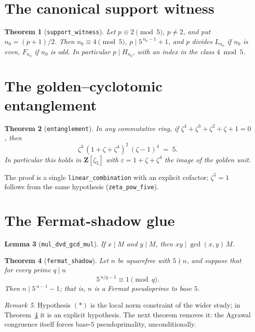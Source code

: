 \documentclass[11pt]{amsart}
\newtheorem{theorem}{Theorem}[section]
\newtheorem{lemma}[theorem]{Lemma}
\theoremstyle{remark}
\newtheorem{remark}[theorem]{Remark}
\newcommand{\eps}{\varepsilon}
\newcommand{\Z}{\mathbf{Z}}
\newcommand{\lean}[1]{\texttt{#1}}
\begin{document}
\section{The canonical support witness}

\begin{theorem}[\lean{support\_witness}]\label{thm:support}
Let \(p\equiv2\pmod5\), \(p\neq2\), and put \(n_0=(p+1)/2\). Then
\(n_0\equiv4\pmod5\), \(p\mid 5^{\,n_0-1}+1\), and \(p\) divides
\(L_{n_0}\) if \(n_0\) is even, \(F_{n_0}\) if \(n_0\) is odd. In
particular \(p\mid H_{n_0}\), with an index in the class
\(4\bmod5\).
\end{theorem}

\section{The golden--cyclotomic entanglement}

\begin{theorem}[\lean{entanglement}]\label{thm:ent}
In any commutative ring, if
\(\zeta^4+\zeta^3+\zeta^2+\zeta+1=0\), then
\[
\zeta^3\,(1+\zeta+\zeta^4)^2\,(\zeta-1)^4 \;=\; 5 .
\]
In particular this holds in \(\Z[\zeta_5]\) with
\(\eps=1+\zeta+\zeta^4\) the image of the golden unit.
\end{theorem}

The proof is a single \lean{linear\_combination} with an explicit
cofactor; \(\zeta^5=1\) follows from the same hypothesis
(\lean{zeta\_pow\_five}).

\section{The Fermat-shadow glue}

\begin{lemma}[\lean{mul\_dvd\_gcd\_mul}]\label{lem:index}
If \(x\mid M\) and \(y\mid M\), then \(xy\mid\gcd(x,y)\,M\).
\end{lemma}

\begin{theorem}[\lean{fermat\_shadow}]\label{thm:shadow}
Let \(n\) be squarefree with \(5\nmid n\), and suppose that for every
prime \(q\mid n\)
\[
5^{\,n/q-1}\equiv1\pmod q .
\tag{\(\ast\)}
\]
Then \(n\mid 5^{\,n-1}-1\); that is, \(n\) is a Fermat pseudoprime to
base \(5\).
\end{theorem}

\begin{remark}
Hypothesis \((\ast)\) is the local norm constraint of the wider study;
in Theorem~\ref{thm:shadow} it is an explicit hypothesis. The next
theorem removes it: the Agrawal congruence itself forces base-\(5\)
pseudoprimality, unconditionally.
\end{remark}
\end{document}

